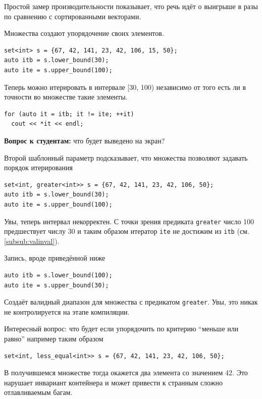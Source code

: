 \documentclass[a4paper,12pt,oneside]{book}
\newif\ifanswers
\begin{document}
Простой замер производительности показывает, что речь идёт о выигрыше в разы по сравнению с сортированными векторами.

Множества создают упорядочение своих элементов.

\begin{lstlisting}
set<int> s = {67, 42, 141, 23, 42, 106, 15, 50};
auto itb = s.lower_bound(30);
auto ite = s.upper_bound(100);
\end{lstlisting}

Теперь можно итерировать в интервале [30, 100) независимо от того есть ли в точности во множестве такие элементы.

\begin{lstlisting}
for (auto it = itb; it != ite; ++it)
  cout << *it << endl;
\end{lstlisting}

\textbf{Вопрос к студентам:} что будет выведено на экран?

\ifanswers
Правильный ответ: 42, 50, 67
\fi

Второй шаблонный параметр подсказывает, что множества позволяют задавать порядок итерирования

\begin{lstlisting}
set<int, greater<int>> s = {67, 42, 141, 23, 42, 106, 50};
auto itb = s.lower_bound(30);
auto ite = s.upper_bound(100);
\end{lstlisting}

Увы, теперь интервал некорректен. С точки зрения предиката \lstinline!greater! число 100 предшествует числу 30 и таким образом итератор \lstinline!ite! не достижим из \lstinline!itb! (см. \ref{subsub:valinval}).

Запись, вроде приведённой ниже

\begin{lstlisting}
auto itb = s.lower_bound(100);
auto ite = s.upper_bound(30);
\end{lstlisting}

Создаёт валидный диапазон для множества с предикатом \lstinline!greater!. Увы, это никак не контролируется на этапе компиляции.

Интересный вопрос: что будет если упорядочить по критерию ``меньше или равно'' например таким образом

\begin{lstlisting}
set<int, less_equal<int>> s = {67, 42, 141, 23, 42, 106, 50};
\end{lstlisting}

В получившемся множестве тогда окажется два элемента со значением 42. Это нарушает инвариант контейнера и может привести к странным сложно отлавливаемым багам.
\end{document}
